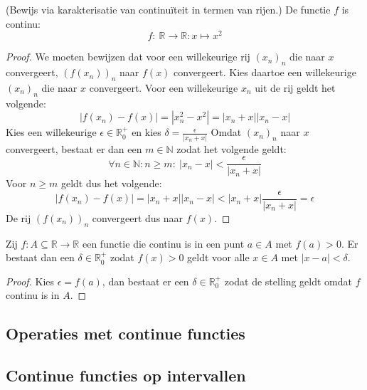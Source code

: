 \documentclass[main.tex]{subfiles}
\begin{document}
\begin{vb}
  (Bewijs via karakterisatie van continu\"iteit in termen van rijen.)
  De functie $f$ is continu:
  \[ f:\ \mathbb{R} \rightarrow \mathbb{R}: x \mapsto x^{2} \]
  
  \begin{proof}
    We moeten bewijzen dat voor een willekeurige rij $(x_{n})_{n}$ die naar $x$ convergeert, $(f(x_{n}))_{n}$ naar $f(x)$ convergeert.
    Kies daartoe een willekeurige $(x_{n})_{n}$ die naar $x$ convergeert.
    Voor een willekeurige $x_{n}$ uit de rij geldt het volgende:
    \[ |f(x_{n})-f(x)| = |x_{n}^{2}-x^{2}| = |x_{n}+x||x_{n}-x| \]
    Kies een willekeurige $\epsilon \in \mathbb{R}_{0}^{+}$ en kies $\delta = \frac{\epsilon}{|x_{n}+x|}$
    Omdat $(x_{n})_{n}$ naar $x$ convergeert, bestaat er dan een $m\in \mathbb{N}$ zodat het volgende geldt:
    \[ \forall n\in \mathbb{N}: n \ge m:\ |x_{n}-x| < \frac{\epsilon}{|x_{n}+x|} \]
    Voor $n \ge m$ geldt dus het volgende:
    \[ |f(x_{n})-f(x)| = |x_{n}+x||x_{n}-x| < |x_{n}+x|\frac{\epsilon}{|x_{n}+x|} = \epsilon \]
    De rij $(f(x_{n}))_{n}$ convergeert dus naar $f(x)$.
  \end{proof}
\end{vb}

\begin{vb}
  Zij $f: A \subseteq \mathbb{R} \rightarrow \mathbb{R}$ een functie die continu is in een punt $a\in A$ met $f(a) > 0$.
  Er bestaat dan een $\delta \in \mathbb{R}_{0}^{+}$ zodat $f(x)>0$ geldt voor alle $x\in A$ met $|x-a| < \delta$.

  \begin{proof}
    Kies $\epsilon = f(a)$, dan bestaat er een $\delta \in \mathbb{R}_{0}^{+}$ zodat de stelling geldt omdat $f$ continu is in $A$.
  \end{proof}
\end{vb}

\subsection{Operaties met continue functies}
\label{sec:oper-met-cont}



\subsection{Continue functies op intervallen}
\label{sec:continue-functies-op}

\end{document}

